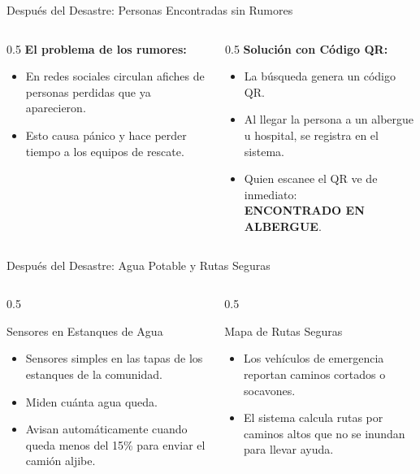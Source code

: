 \documentclass[aspectratio=169]{beamer}
\begin{document}
\begin{frame}{Después del Desastre: Personas Encontradas sin Rumores}
  \begin{columns}
    \begin{column}{0.5\textwidth}
      \textbf{El problema de los rumores:}
      \begin{itemize}
        \item En redes sociales circulan afiches de personas perdidas que ya aparecieron.
        \item Esto causa pánico y hace perder tiempo a los equipos de rescate.
      \end{itemize}
    \end{column}
    \begin{column}{0.5\textwidth}
      \textbf{Solución con Código QR:}
      \begin{itemize}
        \item La búsqueda genera un código QR.
        \item Al llegar la persona a un albergue u hospital, se registra en el sistema.
        \item Quien escanee el QR ve de inmediato: \\ \textcolor{SuccessGreen}{\textbf{ENCONTRADO EN ALBERGUE}}.
      \end{itemize}
    \end{column}
  \end{columns}
\end{frame}

\begin{frame}{Después del Desastre: Agua Potable y Rutas Seguras}
  \begin{columns}
    \begin{column}{0.5\textwidth}
      \begin{block}{Sensores en Estanques de Agua}
        \begin{itemize}
          \item Sensores simples en las tapas de los estanques de la comunidad.
          \item Miden cuánta agua queda.
          \item Avisan automáticamente cuando queda menos del 15\% para enviar el camión aljibe.
        \end{itemize}
      \end{block}
    \end{column}
    \begin{column}{0.5\textwidth}
      \begin{block}{Mapa de Rutas Seguras}
        \begin{itemize}
          \item Los vehículos de emergencia reportan caminos cortados o socavones.
          \item El sistema calcula rutas por caminos altos que no se inundan para llevar ayuda.
        \end{itemize}
      \end{block}
    \end{column}
  \end{columns}
\end{frame}
\end{document}
